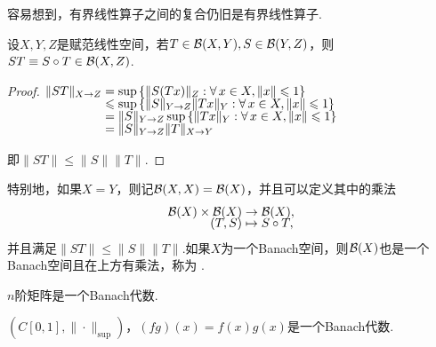 容易想到，有界线性算子之间的复合仍旧是有界线性算子.
\begin{definition}[]
    设$X,Y,Z$是赋范线性空间，若$T\in\mathcal{B}(X,Y),S\in\mathcal{B}(Y,Z)$，则$ST\equiv S\circ T\in\mathcal{B}(X,Z)$.
\end{definition}
\begin{proof}
    $\setjot[-2]\begin{aligned}[t]
        \|ST\|_{X\to Z} &=\sup\left\{\|S(Tx)\|_Z:\forall\, x\in X,\|x\|\leq 1\right\} \\
        &\leq \sup\left\{\|S\|_{Y\to Z}\|Tx\|_Y:\forall\, x\in X,\|x\|\leq 1\right\} \\
        &=\|S\|_{Y\to Z}\sup\left\{\|Tx\|_Y:\forall\, x\in X,\|x\|\leq 1\right\} \\
        &=\|S\|_{Y\to Z}\|T\|_{X\to Y}
    \end{aligned}$\par
    即$\|ST\|\leq \|S\|\|T\|$.
\end{proof}
特别地，如果$X=Y$，则记$\mathcal{B}(X,X)=\mathcal{B}(X)$，并且可以定义其中的乘法\begin{align*}
    \mathcal{B}(X)\times\mathcal{B}(X) &\to\mathcal{B}(X), \\[-6pt]
    (T,S) &\mapsto S\circ T,
\end{align*}
并且满足$\|ST\|\leq \|S\|\|T\|$.如果$X$为一个Banach空间，则$\mathcal{B}(X)$也是一个Banach空间且在上方有乘法，称为 .\par
\begin{instance}
    $n$阶矩阵是一个Banach代数.\par
    $\left(C[0,1],\|\cdot\|_\mathrm{sup}\right)$，$(fg)(x)=f(x)g(x)$是一个Banach代数.
\end{instance}
